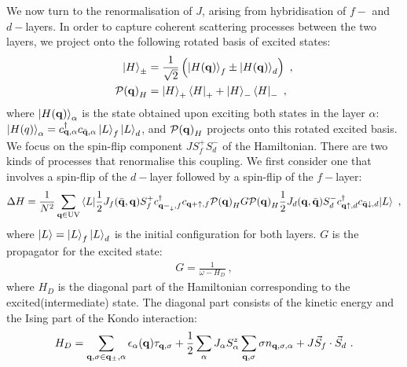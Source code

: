 \documentclass[%
reprint,
superscriptaddress,
groupedaddress,
superscriptaddress,
onecolumn,
10pt
]{revtex4-2}
\begin{document}
We now turn to the renormalisation of \(J\), arising from hybridisation of \(f-\) and \(d-\)layers. In order to capture coherent scattering processes between the two layers, we project onto the following rotated basis of excited states:
\begin{equation}\begin{aligned}
	\ket{H}_\pm &= \frac{1}{\sqrt{2}}\left(\ket{H({\bf q})}_f \pm \ket{H({\bf q})}_d\right)~,\\
	\mathcal{P({\bf q})}_H &= \ket{H}_+\bra{H}_+ + \ket{H}_-\bra{H}_-~,
\end{aligned}\end{equation}
where \(\ket{H({\bf q})}_\alpha\) is the state obtained upon exciting both states in the layer \(\alpha\): \(\ket{H(q)}_\alpha = c^\dagger_{{\bf q},\alpha}c_{\bar {\bf q},\alpha}\ket{L}_f\ket{L}_d\), and \(\mathcal{P({\bf q})}_H\) projects onto this rotated excited basis. We focus on the spin-flip component \(J S_f^+ S_d^-\) of the Hamiltonian. There are two kinds of processes that renormalise this coupling. We first consider one that involves a spin-flip of the \(d-\)layer followed by a spin-flip of the \(f-\)layer:
\begin{equation}\begin{aligned}\label{rgEqtn1}
	\Delta H = \frac{1}{N^2}\sum_{{\bf q} \in \text{UV}}\braket{L | \frac{1}{2}J_f(\bar{\bf q},{\bf q}) S_f^+ c^\dagger_{{\bf q-}_\downarrow,f}c_{{\bf q+}\uparrow,f} \mathcal{P({\bf q})}_H G \mathcal{P({\bf q})}_H\frac{1}{2}J_d({\bf q},\bar{\bf q})S_d^- c^\dagger_{{\bf q}\uparrow,d}c_{\bar {\bf q}\downarrow,d} | L }~,
\end{aligned}\end{equation}
where \(\ket{L} = \ket{L}_f \ket{L}_d\) is the initial configuration for both layers. \(G\) is the propagator for the excited state:
\begin{equation}\begin{aligned}
	G = \frac{1}{\omega - H_D}~,
\end{aligned}\end{equation}
where \(H_D\) is the diagonal part of the Hamiltonian corresponding to the excited(intermediate) state. The diagonal part consists of the kinetic energy and the Ising part of the Kondo interaction:
\begin{equation}\begin{aligned}
	H_D = \sum_{{\bf q,\sigma}\in{\bf q}_\pm, \alpha}\epsilon_\alpha({\bf q})\tau_{{\bf q},\sigma} + \frac{1}{2}\sum_\alpha J_\alpha S_\alpha^z \sum_{{\bf q},\sigma}\sigma n_{{\bf q},\sigma,\alpha} + J \vec{S}_f \cdot \vec{S}_d~.
\end{aligned}\end{equation}
\end{document}
